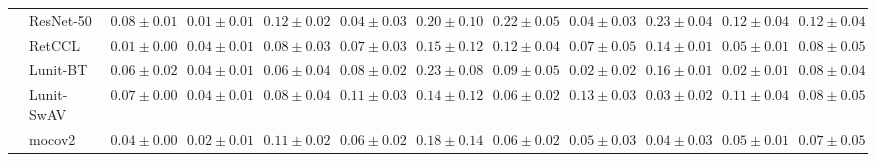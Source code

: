 \begin{tabular}{ll|cccc|c|cccc|c}
 & ResNet-50 & $0.08 \pm 0.01$ & $\mathbf{0.01 \pm 0.01}$ & $0.12 \pm 0.02$ & $0.04 \pm 0.03$ & $0.20 \pm 0.10$ & $0.22 \pm 0.05$ & $0.04 \pm 0.03$ & $0.23 \pm 0.04$ & $0.12 \pm 0.04$ & $0.12 \pm 0.04$ \\
 & RetCCL & $0.01 \pm 0.00$ & $0.04 \pm 0.01$ & $0.08 \pm 0.03$ & $0.07 \pm 0.03$ & $0.15 \pm 0.12$ & $0.12 \pm 0.04$ & $0.07 \pm 0.05$ & $0.14 \pm 0.01$ & $0.05 \pm 0.01$ & $0.08 \pm 0.05$ \\
 & Lunit-BT & $0.06 \pm 0.02$ & $0.04 \pm 0.01$ & $0.06 \pm 0.04$ & $0.08 \pm 0.02$ & $0.23 \pm 0.08$ & $0.09 \pm 0.05$ & $0.02 \pm 0.02$ & $0.16 \pm 0.01$ & $0.02 \pm 0.01$ & $0.08 \pm 0.04$ \\
 & Lunit-SwAV & $0.07 \pm 0.00$ & $0.04 \pm 0.01$ & $0.08 \pm 0.04$ & $0.11 \pm 0.03$ & $0.14 \pm 0.12$ & $0.06 \pm 0.02$ & $0.13 \pm 0.03$ & $0.03 \pm 0.02$ & $0.11 \pm 0.04$ & $0.08 \pm 0.05$ \\
 & mocov2 & $0.04 \pm 0.00$ & $0.02 \pm 0.01$ & $0.11 \pm 0.02$ & $0.06 \pm 0.02$ & $0.18 \pm 0.14$ & $0.06 \pm 0.02$ & $0.05 \pm 0.03$ & $0.04 \pm 0.03$ & $0.05 \pm 0.01$ & $0.07 \pm 0.05$ \\
\cline{1-12}
\bottomrule
\end{tabular}
